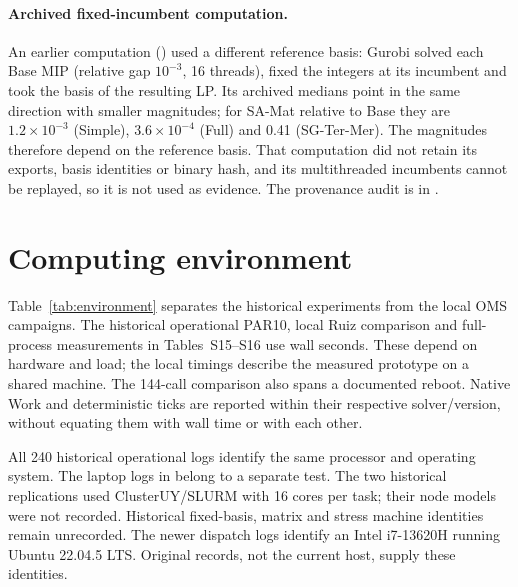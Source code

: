 \documentclass[11pt]{article}
\begin{document}
\paragraph{Archived fixed-incumbent computation.}
An earlier computation () used a different reference
basis: Gurobi solved each Base MIP (relative gap $10^{-3}$, 16 threads), fixed the integers at its
incumbent and took the basis of the resulting LP. Its archived medians point in the same
direction with smaller magnitudes; for SA-Mat relative to Base they are $1.2\times10^{-3}$
(Simple), $3.6\times10^{-4}$ (Full) and 0.41 (SG-Ter-Mer). The magnitudes therefore depend on the
reference basis. That computation did not retain its exports, basis identities or binary hash,
and its multithreaded incumbents cannot be replayed, so it is not used as evidence. The
provenance audit is in .

\section{Computing environment}
Table~\ref{tab:environment} separates the historical experiments from the local OMS
campaigns. The historical operational PAR10, local Ruiz comparison and full-process
measurements in Tables~S15--S16 use wall seconds. These depend on hardware and load;
the local timings describe the measured prototype on a shared machine. The 144-call
comparison also spans a documented reboot. Native Work and deterministic ticks are
reported within their respective solver/version, without equating them with wall time
or with each other.

All 240 historical operational logs identify the same processor and operating system.
The laptop logs in  belong to a separate test.
The two historical replications used ClusterUY/SLURM with 16 cores per task; their
node models were not recorded. Historical fixed-basis, matrix and stress machine
identities remain unrecorded. The newer dispatch logs identify an Intel i7-13620H
running Ubuntu 22.04.5 LTS. Original records, not the current host, supply these identities.

\begin{table}[tb]
\centering\footnotesize
\caption{Computing environment by campaign. Missing historical machine identities
are not reconstructed. Local wall times depend on the shared-machine load; offline
reference LP settings are stated in the corresponding protocols.}
\label{tab:environment}
\resizebox{\textwidth}{!}{}
\end{table}
\end{document}
